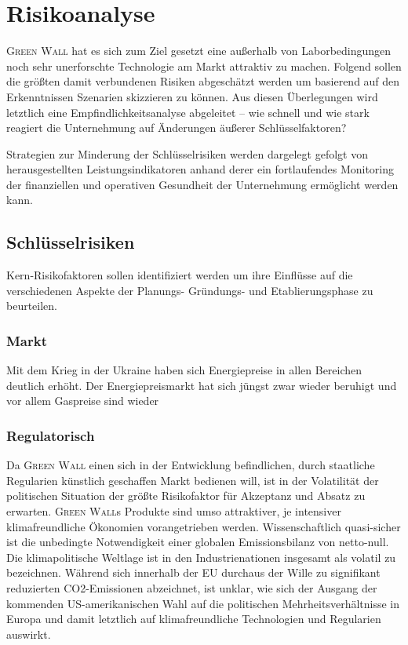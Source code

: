 \chapter{Risikoanalyse}

    \textsc{Green Wall} hat es sich zum Ziel gesetzt eine außerhalb von Laborbedingungen noch sehr unerforschte Technologie am Markt attraktiv zu machen.
    Folgend sollen die größten damit verbundenen Risiken abgeschätzt werden um basierend auf den Erkenntnissen Szenarien skizzieren zu können.
    Aus diesen Überlegungen wird letztlich eine Empfindlichkeitsanalyse abgeleitet -- wie schnell und wie stark reagiert die Unternehmung auf Änderungen äußerer Schlüsselfaktoren?\par\medskip

    Strategien zur Minderung der Schlüsselrisiken werden dargelegt gefolgt von herausgestellten Leistungsindikatoren anhand derer ein fortlaufendes Monitoring der finanziellen und operativen Gesundheit der Unternehmung ermöglicht werden kann.

    \section{Schlüsselrisiken}

        Kern-Risikofaktoren sollen identifiziert werden um ihre Einflüsse auf die verschiedenen Aspekte der Planungs- Gründungs- und Etablierungsphase zu beurteilen.

        \subsection{Markt}

            Mit dem Krieg in der Ukraine haben sich Energiepreise in allen Bereichen deutlich erhöht.
            Der Energiepreismarkt hat sich jüngst zwar wieder beruhigt und vor allem Gaspreise sind wieder 

        \subsection{Regulatorisch}
            Da \textsc{Green Wall} einen sich in der Entwicklung befindlichen, durch staatliche Regularien künstlich geschaffen Markt bedienen will, ist in der Volatilität der politischen Situation der größte Risikofaktor für Akzeptanz und Absatz zu erwarten.
            \textsc{Green Wall}s Produkte sind umso attraktiver, je intensiver klimafreundliche Ökonomien vorangetrieben werden. 
            Wissenschaftlich quasi-sicher ist die unbedingte Notwendigkeit einer globalen Emissionsbilanz von netto-null.
            Die klimapolitische Weltlage ist in den Industrienationen insgesamt als volatil zu bezeichnen.
            Während sich innerhalb der EU durchaus der Wille zu signifikant reduzierten CO2-Emissionen abzeichnet, ist unklar, wie sich der Ausgang der kommenden US-amerikanischen Wahl auf die politischen Mehrheitsverhältnisse in Europa und damit letztlich auf klimafreundliche Technologien und Regularien auswirkt.
            
